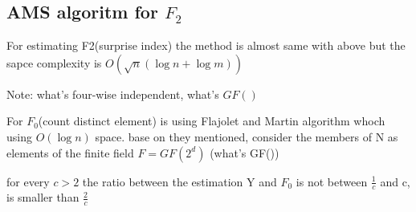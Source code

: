 \documentclass{article}
\begin{document}
\subsection{ AMS algoritm for $F_2$}
For estimating F2(surprise index) the method is almost same with above but the sapce complexity is $O(\sqrt{n}(\log n + \log m))$

Note: what's four-wise independent, what's $GF()$

For $F_0$(count distinct element) is using Flajolet and Martin algorithm whoch using $O(\log n)$ space. base on they mentioned, consider the members of N as elements of the finite field $F = GF(2^d)$ (what's GF())

for every $c > 2$ the ratio between the estimation Y and $F_0$ is not between $\frac{1}{c}$ and c, is smaller than $\frac{2}{c}$
\end{document}
